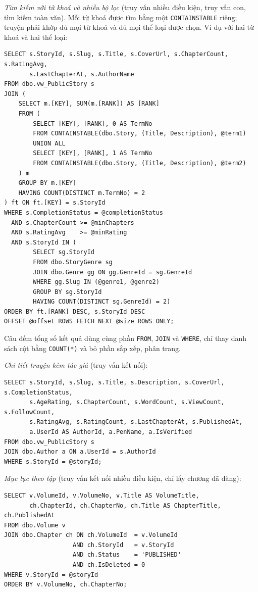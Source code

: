 \textit{Tìm kiếm với từ khoá và nhiều bộ lọc} (truy vấn nhiều điều kiện, truy vấn con, tìm kiếm toàn văn). Mỗi từ khoá được tìm bằng một \texttt{CONTAINSTABLE} riêng; truyện phải khớp đủ mọi từ khoá và đủ mọi thể loại được chọn. Ví dụ với hai từ khoá và hai thể loại:
\begin{verbatim}
SELECT s.StoryId, s.Slug, s.Title, s.CoverUrl, s.ChapterCount, s.RatingAvg,
       s.LastChapterAt, s.AuthorName
FROM dbo.vw_PublicStory s
JOIN (
    SELECT m.[KEY], SUM(m.[RANK]) AS [RANK]
    FROM (
        SELECT [KEY], [RANK], 0 AS TermNo
        FROM CONTAINSTABLE(dbo.Story, (Title, Description), @term1)
        UNION ALL
        SELECT [KEY], [RANK], 1 AS TermNo
        FROM CONTAINSTABLE(dbo.Story, (Title, Description), @term2)
    ) m
    GROUP BY m.[KEY]
    HAVING COUNT(DISTINCT m.TermNo) = 2
) ft ON ft.[KEY] = s.StoryId
WHERE s.CompletionStatus = @completionStatus
  AND s.ChapterCount >= @minChapters
  AND s.RatingAvg    >= @minRating
  AND s.StoryId IN (
        SELECT sg.StoryId
        FROM dbo.StoryGenre sg
        JOIN dbo.Genre gg ON gg.GenreId = sg.GenreId
        WHERE gg.Slug IN (@genre1, @genre2)
        GROUP BY sg.StoryId
        HAVING COUNT(DISTINCT sg.GenreId) = 2)
ORDER BY ft.[RANK] DESC, s.StoryId DESC
OFFSET @offset ROWS FETCH NEXT @size ROWS ONLY;
\end{verbatim}
Câu đếm tổng số kết quả dùng cùng phần \texttt{FROM}, \texttt{JOIN} và \texttt{WHERE}, chỉ thay danh sách cột bằng \texttt{COUNT(*)} và bỏ phần sắp xếp, phân trang.

\textit{Chi tiết truyện kèm tác giả} (truy vấn kết nối):
\begin{verbatim}
SELECT s.StoryId, s.Slug, s.Title, s.Description, s.CoverUrl, s.CompletionStatus,
       s.AgeRating, s.ChapterCount, s.WordCount, s.ViewCount, s.FollowCount,
       s.RatingAvg, s.RatingCount, s.LastChapterAt, s.PublishedAt,
       a.UserId AS AuthorId, a.PenName, a.IsVerified
FROM dbo.vw_PublicStory s
JOIN dbo.Author a ON a.UserId = s.AuthorId
WHERE s.StoryId = @storyId;
\end{verbatim}

\textit{Mục lục theo tập} (truy vấn kết nối nhiều điều kiện, chỉ lấy chương đã đăng):
\begin{verbatim}
SELECT v.VolumeId, v.VolumeNo, v.Title AS VolumeTitle,
       ch.ChapterId, ch.ChapterNo, ch.Title AS ChapterTitle, ch.PublishedAt
FROM dbo.Volume v
JOIN dbo.Chapter ch ON ch.VolumeId  = v.VolumeId
                   AND ch.StoryId   = v.StoryId
                   AND ch.Status    = 'PUBLISHED'
                   AND ch.IsDeleted = 0
WHERE v.StoryId = @storyId
ORDER BY v.VolumeNo, ch.ChapterNo;
\end{verbatim}

